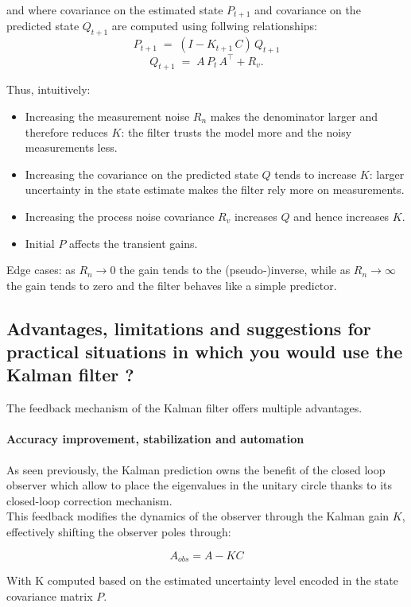 and where covariance on the estimated state \(P_{t+1}\) and covariance on the predicted state \(Q_{t+1}\) are computed using follwing relationships:
\[
P_{t+1} \;=\; (I - K_{t+1}\,C)\,Q_{t+1} 
\]
\[
Q_{t+1} \;=\; A\,P_t\,A^\top + R_v.
\]

Thus, intuitively:
\begin{itemize}
    \item Increasing the measurement noise \(R_n\) makes the denominator larger and therefore reduces \(K\): the filter trusts the model more and the noisy measurements less.
    \item Increasing the covariance on the predicted state \(Q\) tends to increase \(K\): larger uncertainty in the state estimate makes the filter rely more on measurements.
    \item Increasing the process noise covariance \(R_v\) increases \(Q\) and hence increases \(K\).
    \item Initial \(P\) affects the transient gains.
\end{itemize}
Edge cases: as \(R_n\to 0\) the gain tends to the (pseudo‑)inverse, while as \(R_n\to\infty\) the gain tends to zero and the filter behaves like a simple predictor.

\subsection{Advantages, limitations and suggestions for practical situations in which you would use the Kalman filter ?}

The feedback mechanism of the Kalman filter offers multiple advantages.
\paragraph{Accuracy improvement, stabilization and automation}
As seen previously, the Kalman prediction owns the benefit of the closed loop observer which allow to place the eigenvalues in the unitary circle thanks to its closed-loop correction mechanism.\\
This feedback modifies the dynamics of the observer through the Kalman gain $K$, effectively shifting the observer poles through:

\begin{equation}
A_{obs} = A-KC
\end{equation}

With K computed based on the estimated uncertainty level encoded in the state covariance matrix $P$.


